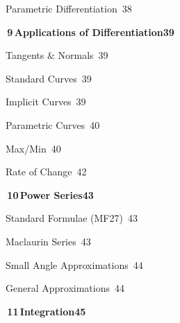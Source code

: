 \documentclass[a4paper,openany]{book}
\begin{document}
{\noindent{}\quad Parametric Differentiation\dotfill\ 38\par
\medskip\noindent\colorbox{blue!8}{\parbox{\dimexpr\textwidth-2\fboxsep}{\large\bfseries\color{blue!50!black}\colorbox{blue!50!black}{\color{white}\,9\,}\quad Applications of Differentiation\hfill 39}}\par\nopagebreak\smallskip\nopagebreak
\noindent{}\quad Tangents \& Normals\dotfill\ 39\par
\noindent{}\quad Standard Curves\dotfill\ 39\par
\noindent{}\quad Implicit Curves\dotfill\ 39\par
\noindent{}\quad Parametric Curves\dotfill\ 40\par
\noindent{}\quad Max/Min\dotfill\ 40\par
\noindent{}\quad Rate of Change\dotfill\ 42\par
\medskip\noindent\colorbox{blue!8}{\parbox{\dimexpr\textwidth-2\fboxsep}{\large\bfseries\color{blue!50!black}\colorbox{blue!50!black}{\color{white}\,10\,}\quad Power Series\hfill 43}}\par\nopagebreak\smallskip\nopagebreak
\noindent{}\quad Standard Formulae (MF27)\dotfill\ 43\par
\noindent{}\quad Maclaurin Series\dotfill\ 43\par
\noindent{}\quad Small Angle Approximations\dotfill\ 44\par
\noindent{}\quad General Approximations\dotfill\ 44\par
\medskip\noindent\colorbox{blue!8}{\parbox{\dimexpr\textwidth-2\fboxsep}{\large\bfseries\color{blue!50!black}\colorbox{blue!50!black}{\color{white}\,11\,}\quad Integration\hfill 45}}\par\nopagebreak\smallskip\nopagebreak
}
\end{document}
